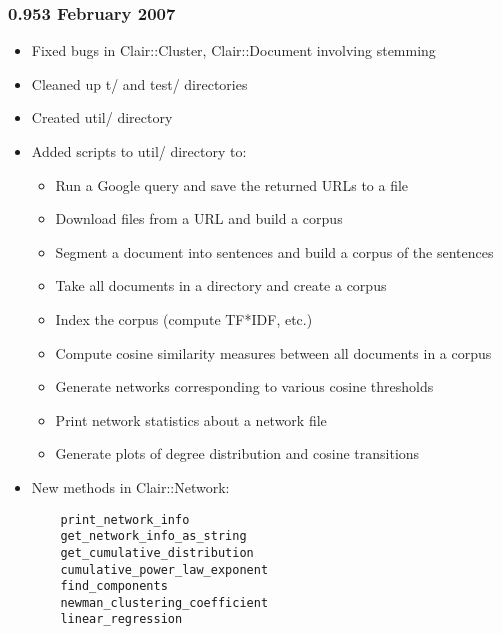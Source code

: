 \subsubsection*{0.953 February 2007\label{0_953_February_2007}}
\begin{itemize}

\item Fixed bugs in Clair::Cluster, Clair::Document involving stemming
\item Cleaned up t/ and test/ directories
\item Created util/ directory
\item Added scripts to util/ directory to:\begin{itemize}

\item Run a Google query and save the returned URLs to a file
\item Download files from a URL and build a corpus
\item Segment a document into sentences and build a corpus of the sentences
\item Take all documents in a directory and create a corpus
\item Index the corpus (compute TF*IDF, etc.)
\item Compute cosine similarity measures between all documents in a corpus
\item Generate networks corresponding to various cosine thresholds
\item Print network statistics about a network file
\item Generate plots of degree distribution and cosine transitions\end{itemize}

\item New methods in Clair::Network:\begin{verbatim}
    print_network_info
    get_network_info_as_string
    get_cumulative_distribution
    cumulative_power_law_exponent
    find_components
    newman_clustering_coefficient
    linear_regression
\end{verbatim}
\end{itemize}
